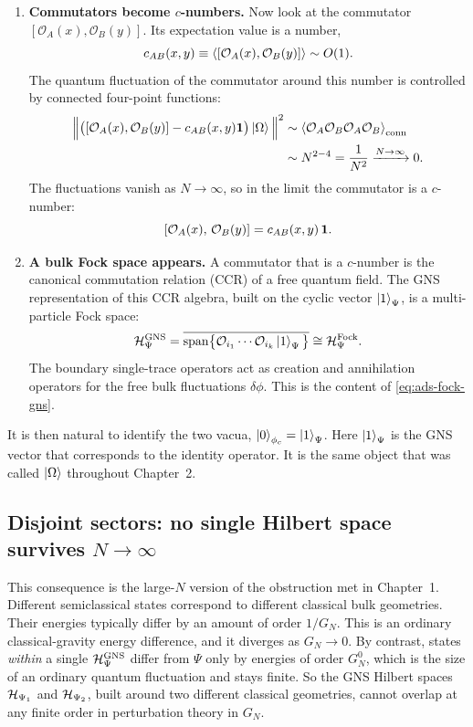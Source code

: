 \begin{keyresult}
\begin{enumerate}[leftmargin=*]
\item \textbf{Commutators become $c$-numbers.}
Now look at the commutator $[\mathcal{O}_A(x), \mathcal{O}_B(y)]$. Its expectation value is a number,
\[
c_{AB}(x, y) \equiv \Braket{[\mathcal{O}_A(x), \mathcal{O}_B(y)]} \sim O(1) .
\]
The quantum fluctuation of the commutator around this number is controlled by connected four-point functions:
\[
\begin{split}
\Big\| \big([\mathcal{O}_A(x), \mathcal{O}_B(y)] - c_{AB}(x, y)\mathbf{1}\big)\ket\Omega \Big\|^2
&\sim \Braket{\mathcal{O}_A\mathcal{O}_B\mathcal{O}_A\mathcal{O}_B}_{\text{conn}} \\
&\sim N^{2-4} = \frac{1}{N^2} \xrightarrow{N\to\infty} 0 .
\end{split}
\]
The fluctuations vanish as $N \to \infty$, so in the limit the commutator is a $c$-number:
\[
[\mathcal{O}_A(x), \, \mathcal{O}_B(y)] = c_{AB}(x, y)\,\mathbf{1} .
\]

\item \textbf{A bulk Fock space appears.}
A commutator that is a $c$-number is the canonical commutation relation (CCR) of a free quantum field. The GNS representation of this CCR algebra, built on the cyclic vector $\ket1_\Psi$, is a multi-particle Fock space:
\[
\mathcal{H}_\Psi^{\text{GNS}} = \overline{\mathrm{span}\big\{\mathcal{O}_{i_1} \cdots \mathcal{O}_{i_k}\ket1_\Psi\big\}} \cong \mathcal{H}_\Psi^{\text{Fock}} .
\]
The boundary single-trace operators act as creation and annihilation operators for the free bulk fluctuations $\delta\phi$. This is the content of \eqref{eq:ads-fock-gns}.
\end{enumerate}
\end{keyresult}

It is then natural to identify the two vacua, $\ket0_{\phi_c}=\ket1_\Psi$. Here $\ket1_\Psi$ is the GNS vector
that corresponds to the identity operator. It is the same object that was called $\ket\Omega$ throughout
Chapter~2.

\subsection*{Disjoint sectors: no single Hilbert space survives $N\to\infty$}

This consequence is the large-$N$ version of the obstruction met in Chapter~1. Different semiclassical states
correspond to different classical bulk geometries. Their energies typically differ by an amount of order
$1/G_N$. This is an ordinary classical-gravity energy difference, and it diverges as $G_N\to0$. By contrast,
states \emph{within} a single $\mathcal{H}_\Psi^{\text{GNS}}$ differ from $\Psi$ only by energies of order $G_N^0$,
which is the size of an ordinary quantum fluctuation and stays finite. So the GNS Hilbert spaces
$\mathcal{H}_{\Psi_1}$ and $\mathcal{H}_{\Psi_2}$, built around two different classical geometries, cannot overlap at any finite
order in perturbation theory in $G_N$.

